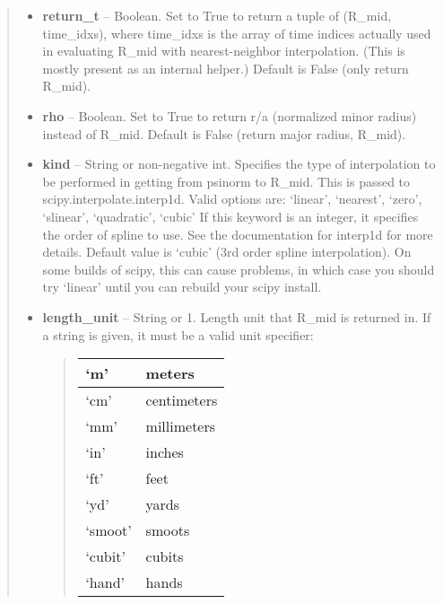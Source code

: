 \documentclass[letterpaper,10pt,english]{sphinxmanual}
\begin{document}
\begin{fulllineitems}
\begin{fulllineitems}
\begin{quote}
\begin{description}
\begin{itemize}
\item {} 
\textbf{return\_t} --
Boolean.
Set to True to return a tuple of (R\_mid,
time\_idxs), where time\_idxs is the array of time indices
actually used in evaluating R\_mid with nearest-neighbor
interpolation. (This is mostly present as an internal helper.)
Default is False (only return R\_mid).

\item {} 
\textbf{rho} --
Boolean.
Set to True to return r/a (normalized minor radius)
instead of R\_mid. Default is False (return major radius, R\_mid).

\item {} 
\textbf{kind} --
String or non-negative int.
Specifies the type of interpolation
to be performed in getting from psinorm to R\_mid. This is
passed to scipy.interpolate.interp1d. Valid options are:
`linear', `nearest', `zero', `slinear', `quadratic', `cubic'
If this keyword is an integer, it specifies the order of spline
to use. See the documentation for interp1d for more details.
Default value is `cubic' (3rd order spline interpolation). On
some builds of scipy, this can cause problems, in which case
you should try `linear' until you can rebuild your scipy install.

\item {} 
\textbf{length\_unit} --
String or 1.
Length unit that R\_mid is returned in. If
a string is given, it must be a valid unit specifier:
\begin{quote}

\begin{tabulary}{\linewidth}{|L|L|}
\hline

`m'
 & 
meters
\\\hline

`cm'
 & 
centimeters
\\\hline

`mm'
 & 
millimeters
\\\hline

`in'
 & 
inches
\\\hline

`ft'
 & 
feet
\\\hline

`yd'
 & 
yards
\\\hline

`smoot'
 & 
smoots
\\\hline

`cubit'
 & 
cubits
\\\hline

`hand'
 & 
hands
\\\hline


\end{tabulary}
\end{quote}
\end{itemize}
\end{description}
\end{quote}
\end{fulllineitems}
\end{fulllineitems}
\end{document}
